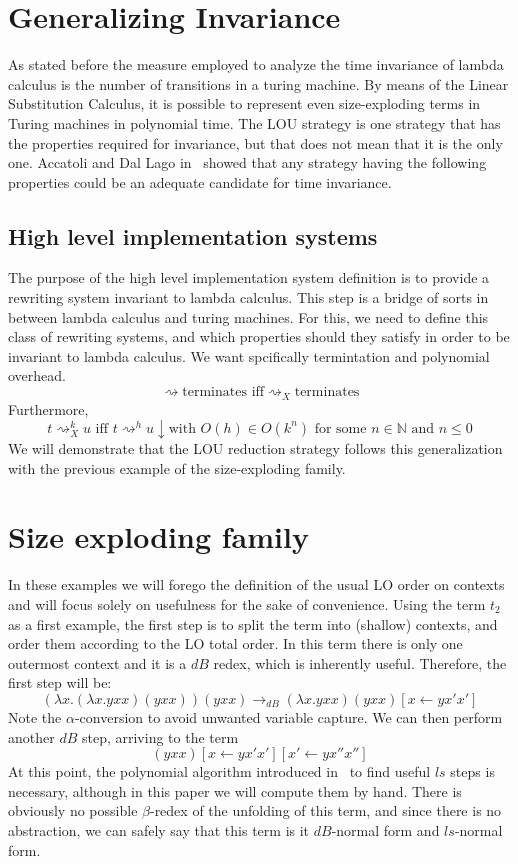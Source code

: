 \message{ !name(VU-CS-BSc-thesis-template.tex)}\documentclass[11pt]{article}
\begin{document}
\section{Generalizing Invariance}
As stated before the measure employed to analyze the time invariance of lambda calculus is the number of transitions in a turing machine. By means of the Linear Substitution Calculus, it is possible to represent even size-exploding terms in Turing machines in polynomial time. The LOU strategy is one strategy that has the properties required for invariance, but that does not mean that it is the only one. Accatoli and Dal Lago in~\cite{beta-invariance} showed that any strategy having the following properties could be an adequate candidate for time invariance.
\subsection{High level implementation systems}
The purpose of the high level implementation system definition is to provide a rewriting system invariant to lambda calculus. This step is a bridge of sorts in between lambda calculus and turing machines. For this, we need to define this class of rewriting systems, and which properties should they satisfy in order to be invariant to lambda calculus. We want spcifically termintation and polynomial overhead.
\[\rightsquigarrow \text{terminates iff} {\rightsquigarrow}_{X} \text{terminates}\]
Furthermore,
\[t {\rightsquigarrow}_{X}^k u \text{ iff } t {\rightsquigarrow}^h u\downarrow \text{with } O(h) \in O(k^n) \text{ for some } n \in \mathbb{N} \text{ and } n \leq 0 \]
We will demonstrate that the LOU reduction strategy follows this generalization with the previous example of the size-exploding family.
\section{Size exploding family}
In these examples we will forego the definition of the usual LO order on contexts and will focus solely on usefulness for the sake of convenience.
Using the term $t_2$ as a first example, the first step is to split the term into (shallow) contexts, and order them according to the LO total order. In this term there is only one outermost context and it is a $dB$ redex, which is inherently useful. Therefore, the first step will be:
\begin{equation*}
  (\lambda x . (\lambda x . yxx) (yxx))(yxx) \rightarrow_{dB} (\lambda x . yxx)(yxx)[x \leftarrow yx'x']
\end{equation*}
Note the $\alpha$-conversion to avoid unwanted variable capture.
We can then perform another $dB$ step, arriving to the term
\begin{equation*}
  (yxx)[x \leftarrow yx'x'][x' \leftarrow yx''x'']
\end{equation*}
At this point, the polynomial algorithm introduced in~\cite{beta-invariance} to find useful $ls$ steps is necessary, although in this paper we will compute them by hand. There is obviously no possible $\beta$-redex of the unfolding of this term, and since there is no abstraction, we can safely say that this term is it $dB$-normal form and $ls$-normal form.
\end{document}
